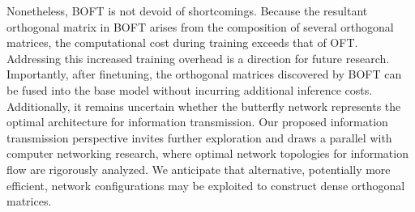 Nonetheless, BOFT is not devoid of shortcomings. Because the resultant orthogonal matrix in BOFT arises from the composition of several orthogonal matrices, the computational cost during training exceeds that of OFT. Addressing this increased training overhead is a direction for future research. Importantly, after finetuning, the orthogonal matrices discovered by BOFT can be fused into the base model without incurring additional inference costs. Additionally, it remains uncertain whether the butterfly network represents the optimal architecture for information transmission. Our proposed information transmission perspective invites further exploration and draws a parallel with computer networking research, where optimal network topologies for information flow are rigorously analyzed. We anticipate that alternative, potentially more efficient, network configurations may be exploited to construct dense orthogonal matrices.